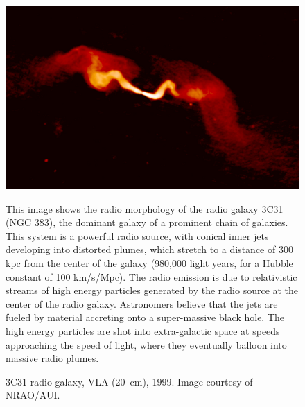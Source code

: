 \documentclass[10pt,a4paper,english]{article}
\begin{document}
\begin{figure}[!ht]
    \noindent
    \begin{minipage}{.495\textwidth}
        \includegraphics[width=\textwidth]{3c31lbcd_6in_hi.jpg}
        \caption{
            3C31 radio galaxy, VLA (\SI{20}{\cm}), 1999.
            Image courtesy of NRAO/AUI.
        }

        This image shows the radio morphology of the radio galaxy 3C31 (NGC
        383), the dominant galaxy of a prominent chain of galaxies. This system
        is a powerful radio source, with conical inner jets developing into
        distorted plumes, which stretch to a distance of 300 kpc from the
        center of the galaxy (980,000 light years, for a Hubble constant of 100
        km/s/Mpc). The radio emission is due to relativistic streams of high
        energy particles generated by the radio source at the center of the
        radio galaxy. Astronomers believe that the jets are fueled by material
        accreting onto a super-massive black hole. The high energy particles
        are shot into extra-galactic space at speeds approaching the speed of
        light, where they eventually balloon into massive radio plumes.
    \end{minipage}%
    \hfill
    \begin{minipage}{.495\textwidth}
    \end{minipage}
\end{figure}
\end{document}
